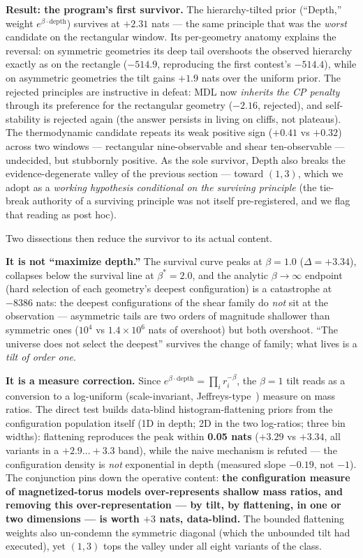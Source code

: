 \documentclass[aps,prd,preprint,nofootinbib]{revtex4-2}
\begin{document}
\textbf{Result: the program's first survivor.} The hierarchy-tilted prior
(``Depth,'' weight $e^{\beta\cdot\mathrm{depth}}$) survives at $+2.31$ nats ---
the same principle that was the \emph{worst} candidate on the rectangular
window. Its per-geometry anatomy explains the reversal: on symmetric geometries
its deep tail overshoots the observed hierarchy exactly as on the rectangle
($-514.9$, reproducing the first contest's $-514.4$), while on asymmetric
geometries the tilt gains $+1.9$ nats over the uniform prior. The rejected
principles are instructive in defeat: MDL now \emph{inherits the CP penalty}
through its preference for the rectangular geometry ($-2.16$, rejected), and
self-stability is rejected again (the answer persists in living on cliffs, not
plateaus). The thermodynamic candidate repeats its weak positive sign ($+0.41$
vs $+0.32$) across two windows --- rectangular nine-observable and shear
ten-observable --- undecided, but stubbornly positive. As the sole survivor,
Depth also breaks the evidence-degenerate valley of the previous section ---
toward $(1,3)$, which we adopt as a \emph{working hypothesis conditional on the
surviving principle} (the tie-break authority of a surviving principle was not
itself pre-registered, and we flag that reading as post hoc).

Two dissections then reduce the survivor to its actual content.

\textbf{It is not ``maximize depth.''} The survival curve peaks at $\beta=1.0$
($\Delta=+3.34$), collapses below the survival line at $\beta^*=2.0$, and the
analytic $\beta\to\infty$ endpoint (hard selection of each geometry's deepest
configuration) is a catastrophe at $-8386$ nats: the deepest configurations of
the shear family do \emph{not} sit at the observation --- asymmetric tails are
two orders of magnitude shallower than symmetric ones ($10^4$ vs $1.4\times
10^6$ nats of overshoot) but both overshoot. ``The universe does not select the
deepest'' survives the change of family; what lives is a \emph{tilt of order
one}.

\textbf{It is a measure correction.} Since
$e^{\beta\cdot\mathrm{depth}}=\prod_i r_i^{-\beta}$, the $\beta=1$ tilt reads
as a conversion to a log-uniform (scale-invariant, Jeffreys-type~\cite{Jeffreys})
measure on mass ratios. The direct test builds data-blind histogram-flattening
priors from the configuration population itself (1D in depth; 2D in the two
log-ratios; three bin widths): flattening reproduces the peak within
\textbf{0.05 nats} ($+3.29$ vs $+3.34$, all variants in a $+2.9\ldots+3.3$
band), while the naive mechanism is refuted --- the configuration density is
\emph{not} exponential in depth (measured slope $-0.19$, not $-1$). The
conjunction pins down the operative content: \textbf{the configuration measure
of magnetized-torus models over-represents shallow mass ratios, and removing
this over-representation --- by tilt, by flattening, in one or two dimensions
--- is worth $+3$ nats, data-blind.} The bounded flattening weights also
un-condemn the symmetric diagonal (which the unbounded tilt had executed), yet
$(1,3)$ tops the valley under all eight variants of the class.
\end{document}
